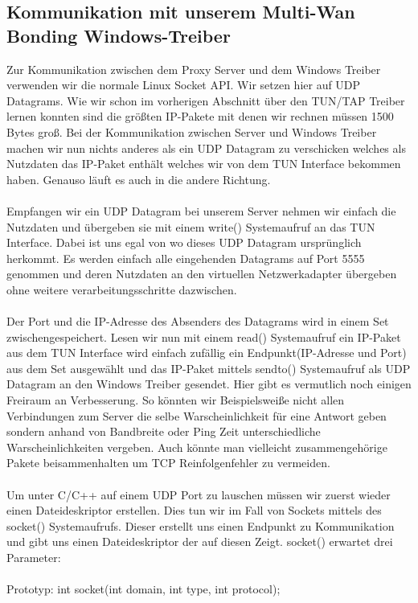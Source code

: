\subsection{Kommunikation mit unserem Multi-Wan Bonding Windows-Treiber}
Zur Kommunikation zwischen dem Proxy Server und dem Windows Treiber verwenden wir die normale Linux Socket API. Wir setzen hier auf UDP Datagrams. Wie wir schon im vorherigen Abschnitt über den TUN/TAP Treiber lernen konnten sind die größten IP-Pakete mit denen wir rechnen müssen 1500 Bytes groß. Bei der Kommunikation zwischen Server und Windows Treiber machen wir nun nichts anderes als ein UDP Datagram zu verschicken welches als Nutzdaten das IP-Paket enthält welches wir von dem TUN Interface bekommen haben. Genauso läuft es auch in die andere Richtung. 
\\\\
Empfangen wir ein UDP Datagram bei unserem Server nehmen wir einfach die Nutzdaten und übergeben sie mit einem write() Systemaufruf an das TUN Interface. Dabei ist uns egal von wo dieses UDP Datagram ursprünglich herkommt. Es werden einfach alle eingehenden Datagrams auf Port 5555 genommen und deren Nutzdaten an den virtuellen Netzwerkadapter übergeben ohne weitere verarbeitungsschritte dazwischen. 
\\\\
Der Port und die IP-Adresse des Absenders des Datagrams wird in einem Set zwischengespeichert. Lesen wir nun mit einem read() Systemaufruf ein IP-Paket aus dem TUN Interface wird einfach zufällig ein Endpunkt(IP-Adresse und Port) aus dem Set ausgewählt und das IP-Paket mittels sendto() Systemaufruf als UDP Datagram an den Windows Treiber gesendet. Hier gibt es vermutlich noch einigen Freiraum an Verbesserung. So könnten wir Beispielsweiße nicht allen Verbindungen zum Server die selbe Warscheinlichkeit für eine Antwort geben sondern anhand von Bandbreite oder Ping Zeit unterschiedliche Warscheinlichkeiten vergeben. Auch könnte man vielleicht zusammengehörige Pakete beisammenhalten um TCP Reinfolgenfehler zu vermeiden.
\\\\
Um unter C/C++ auf einem UDP Port zu lauschen müssen wir zuerst wieder einen Dateideskriptor erstellen. Dies tun wir im Fall von Sockets mittels des socket() Systemaufrufs. Dieser erstellt uns einen Endpunkt zu Kommunikation und gibt uns einen Dateideskriptor der auf diesen Zeigt. socket() erwartet drei Parameter:
\\\\
Prototyp: int socket(int domain, int type, int protocol);
